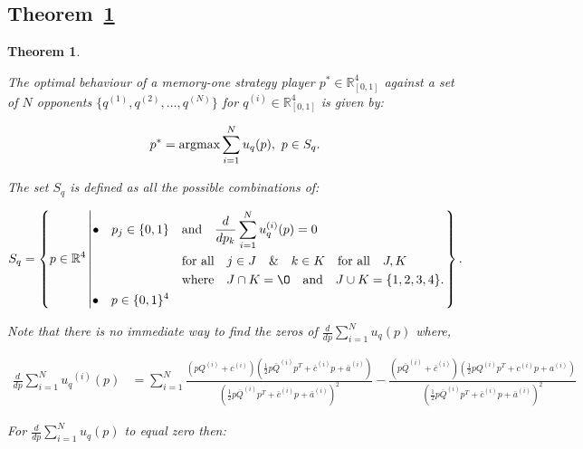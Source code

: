 \documentclass[10pt]{article}
\newcommand{\R}{\mathbb{R}}
\newtheorem{theorem}{Theorem}
\begin{document}
\subsection{Theorem~\ref{memone_group_best_response}}
\begin{theorem}\label{memone_group_best_response}

The optimal behaviour of a memory-one strategy player
\(p^* \in \R_{[0, 1]} ^ 4\)
against a set of \(N\) opponents \(\{q^{(1)}, q^{(2)}, \dots, q^{(N)} \}\)
for \(q^{(i)} \in \R_{[0, 1]} ^ 4\) is given by:

\[p^* = \textnormal{argmax}\sum\limits_{i=1} ^ N  u_q(p), \ p \in S_q.\]

The set \(S_q\) is defined as all the possible combinations of:

{\scriptsize
\begin{equation}\label{eq:s_q_set}
    S_q =
    \left\{p \in \mathbb{R} ^ 4 \left|
        \begin{aligned}
            \bullet\quad p_j \in \{0, 1\} & \quad \text{and} \quad \frac{d}{dp_k} 
            \sum\limits_{i=1} ^ N  u_q^{(i)}(p) = 0 \\
            & \quad \text{for all} \quad j \in J \quad \&  \quad k \in K  \quad \text{for all} \quad J, K \\
            & \quad \text{where} \quad J \cap K = \O \quad
            \text{and} \quad J \cup K = \{1, 2, 3, 4\}.\\
            \bullet\quad  p \in \{0, 1\} ^ 4
        \end{aligned}\right.
    \right\}.
\end{equation}
}

Note that there is no immediate way to find the zeros of
\(\frac{d}{dp} \sum\limits_{i=1} ^ N  u_q(p)\) where,

{\scriptsize
\begin{align}\label{eq:mo_tournament_derivative}
    \frac{d}{dp} \sum\limits_{i=1} ^ {N} {u_q}^{(i)} (p) & = \displaystyle\sum\limits_{i=1} ^ {N}
    \frac{\left(pQ^{(i)} + c^{(i)}\right) \left(\frac{1}{2} p\bar{Q}^{(i)} p^T + \bar{c}^{(i)} p + \bar{a}^ {(i)}\right)}
    {\left(\frac{1}{2} p\bar{Q}^{(i)} p^T + \bar{c}^{(i)} p + \bar{a}^ {(i)}\right)^ 2}
    - \frac{\left(p\bar{Q}^{(i)} + \bar{c}^{(i)}\right) \left(\frac{1}{2} pQ^{(i)} p^T + c^{(i)} p + a^ {(i)}\right)}
    {\left(\frac{1}{2} p\bar{Q}^{(i)} p^T + \bar{c}^{(i)} p + \bar{a}^ {(i)}\right)^ 2}
\end{align}
}

For \(\frac{d}{dp} \sum\limits_{i=1} ^ N  u_q(p)\) to equal zero then:


\end{theorem}
\end{document}
